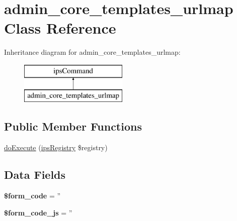 \hypertarget{classadmin__core__templates__urlmap}{\section{admin\-\_\-core\-\_\-templates\-\_\-urlmap Class Reference}
\label{classadmin__core__templates__urlmap}
}
Inheritance diagram for admin\-\_\-core\-\_\-templates\-\_\-urlmap\-:\begin{figure}[H]
\begin{center}
\leavevmode
\includegraphics[height=2.000000cm]{classadmin__core__templates__urlmap}
\end{center}
\end{figure}
\subsection*{Public Member Functions}
\begin{DoxyCompactItemize}
\item 
\hyperlink{classadmin__core__templates__urlmap_afbc4e912a0604b94d47d66744c64d8ba}{do\-Execute} (\hyperlink{classips_registry}{ips\-Registry} \$registry)
\end{DoxyCompactItemize}
\subsection*{Data Fields}
\begin{DoxyCompactItemize}
\item 
\hypertarget{classadmin__core__templates__urlmap_af28aee726fa3eb6c355d08a2ab655e03}{{\bfseries \$form\-\_\-code} = ''}\label{classadmin__core__templates__urlmap_af28aee726fa3eb6c355d08a2ab655e03}

\item 
\hypertarget{classadmin__core__templates__urlmap_ac68fe8a02a2efd63c3271179f4b4fbb7}{{\bfseries \$form\-\_\-code\-\_\-js} = ''}\label{classadmin__core__templates__urlmap_ac68fe8a02a2efd63c3271179f4b4fbb7}

\end{DoxyCompactItemize}
